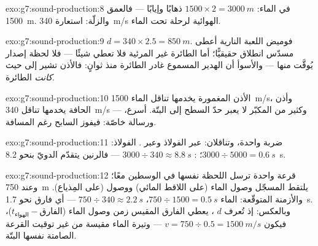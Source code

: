 \begin{solution}{exo:g7:sound-production:8}
في الماء: $1500 \times 2 = \qty{3000}{m}$ ذهابًا وإيابًا ---
فالعمق \qty{1500}{m}. والزلّة: استعارة \qty{340}{m/s} الهوائية
لرحلة تحت الماء.
\end{solution}

\begin{solution}{exo:g7:sound-production:9}
$d = 340 \times 2.5 = \qty{850}{m}$. فوميض اللعبة النارية أعطى
مسدّس انطلاق حقيقيًّا؛ أما الطائرة غير المرئية فلا تعطي شيئًا
--- فلا لحظة إصدار يُوقَّت منها --- والأسوأ أن الهدير المسموع
غادر الطائرة منذ ثوانٍ: فالأذن تشير إلى حيث \emph{كانت}
الطائرة.
\end{solution}

\begin{solution}{exo:g7:sound-production:10}
الأذن المغمورة يخدمها تناقل الماء  \qty{1500}{m/s}، وأذن
الحافة يخدمها تناقل   \qty{340}{m/s} --- وكثير من
 المكبّر لا يعبر حدّ السطح إلى  البتّة.  أسرع،
ورسالة خاصّة: فيفوز السابح رغم المسافة.
\end{solution}

\begin{solution}{exo:g7:sound-production:11}
ضربة واحدة، وتناقلان: عبر الفولاذ وعبر . الفولاذ:
$3000 \div 5000 = \qty{0.6}{s}$؛ : $3000 \div 340 \approx
\qty{8.8}{s}$ --- فالرنين يتقدّم الدويّ بنحو \qty{8.2}{s}.
\end{solution}

\begin{solution}{exo:g7:sound-production:12}
قرعة واحدة ترسل اللحظة نفسها في الوسطين معًا؛ وعند \qty{750}{m}
يلتقط المسجّل وصول الماء (على اللاقط المائي) ووصول  (على
المِذياع). والأزمنة المتوقّعة: الماء $750 \div 1500 =
\qty{0.5}{s}$،  $750 \div 340 \approx \qty{2.2}{s}$ ---
أي فارق نحو \qty{1.7}{s}. وبالعكس: إذ تُعرف $d$  ،
يعطي الفارق المقيس زمن وصول الماء ($t_{\text{الهواء}} -
\text{الفارق}$)، فيكون $v = 750 \div 0.5 = \qty{1500}{m/s}$ ---
وتيرة الماء مقيسة من غير توقيت القرعة الصامتة نفسها البتّة.
\end{solution}

